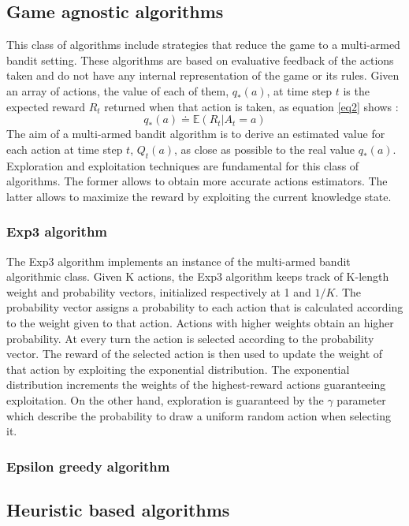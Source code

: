 \documentclass[runningheads]{llncs}
\begin{document}
\subsection{Game agnostic algorithms}
This class of algorithms include strategies that reduce the game
to a multi-armed bandit setting. These algorithms are based on
evaluative feedback of the actions taken and do not have any internal
representation of the game or its rules. Given an array
of actions, the value of each of them, $q_*(a)$, at time step $t$ is the expected
reward $R_t$ returned when that action is taken, as equation \ref{eq2}
shows \cite{rlbook}:
\begin{equation}\label{eq2}
  q_*(a) \doteq \mathbb{E}(R_t | A_t = a)
\end{equation}
The aim of a multi-armed bandit algorithm is to derive an estimated
value for each action at time step $t$, $Q_t(a)$, as close as possible
to the real value $q_*(a)$. Exploration and exploitation techniques
are fundamental for this class of algorithms. The former allows to
obtain more accurate actions estimators. The latter allows to maximize
the reward by exploiting the current knowledge state.

\subsubsection{Exp3 algorithm}
The Exp3 algorithm implements an instance of the multi-armed bandit
algorithmic class. Given K actions, the Exp3 algorithm keeps track of
K-length weight and probability vectors, initialized respectively at 1
and $1/K$. The probability vector
assigns a probability to each action that is calculated according to
the weight given to that action. Actions with higher weights obtain an
higher probability. At every turn the action is selected according to
the probability vector. The reward of the selected action is then used
to update the weight of that action by exploiting the exponential
distribution. The exponential distribution increments the weights of
the highest-reward actions guaranteeing exploitation. On the other hand,
exploration is guaranteed by the $\gamma$ parameter which describe the
probability to draw a uniform random action when selecting it.

\subsubsection{Epsilon greedy algorithm}

\subsection{Heuristic based algorithms}
\end{document}
